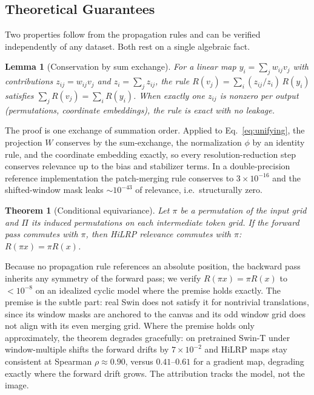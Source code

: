 \documentclass[lettersize,journal]{IEEEtran}
\newtheorem{theorem}{Theorem}
\newtheorem{lemma}{Lemma}
\begin{document}
\subsection{Theoretical Guarantees}
\label{sec:guarantees}
Two properties follow from the propagation rules and can be verified independently of any dataset. Both rest on a single algebraic fact.

\begin{lemma}[Conservation by sum exchange]
\label{lem:conservation}
For a linear map $y_i=\sum_j w_{ij}v_j$ with contributions $z_{ij}=w_{ij}v_j$ and $z_i=\sum_j z_{ij}$, the rule $R(v_j)=\sum_i (z_{ij}/z_i)\,R(y_i)$ satisfies $\sum_j R(v_j)=\sum_i R(y_i)$. When exactly one $z_{ij}$ is nonzero per output (permutations, coordinate embeddings), the rule is exact with no leakage.
\end{lemma}
The proof is one exchange of summation order. Applied to Eq.~\eqref{eq:unifying}, the projection $W$ conserves by the sum-exchange, the normalization $\phi$ by an identity rule, and the coordinate embedding exactly, so every resolution-reduction step conserves relevance up to the bias and stabilizer terms. In a double-precision reference implementation the patch-merging rule conserves to $3\times10^{-16}$ and the shifted-window mask leaks $\sim10^{-43}$ of relevance, i.e.\ structurally zero.

\begin{theorem}[Conditional equivariance]
\label{thm:equivariance}
Let $\pi$ be a permutation of the input grid and $\Pi$ its induced permutations on each intermediate token grid. If the forward pass commutes with $\pi$, then HiLRP relevance commutes with $\pi$: $R(\pi x)=\pi R(x)$.
\end{theorem}
Because no propagation rule references an absolute position, the backward pass inherits any symmetry of the forward pass; we verify $R(\pi x)=\pi R(x)$ to $<10^{-8}$ on an idealized cyclic model where the premise holds exactly. The premise is the subtle part: real Swin does not satisfy it for nontrivial translations, since its window masks are anchored to the canvas and its odd window grid does not align with its even merging grid. Where the premise holds only approximately, the theorem degrades gracefully: on pretrained Swin-T under window-multiple shifts the forward drifts by $7\times10^{-2}$ and HiLRP maps stay consistent at Spearman $\rho{\approx}0.90$, versus $0.41$--$0.61$ for a gradient map, degrading exactly where the forward drift grows. The attribution tracks the model, not the image.
\end{document}
